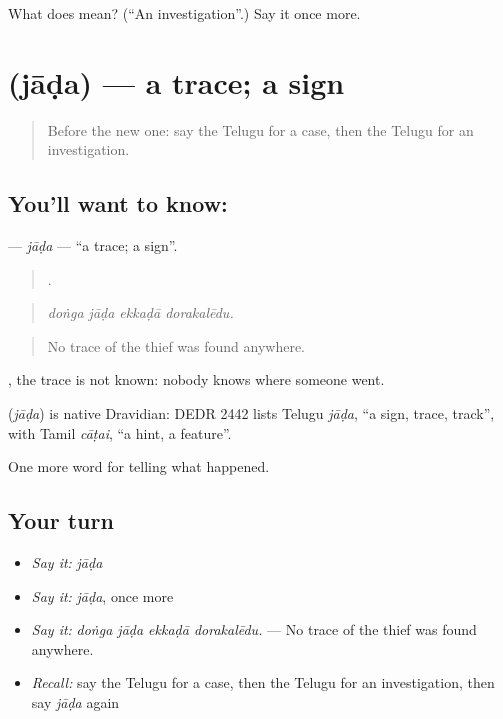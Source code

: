 \begin{tcolorbox}[breakable,colback=teal!4,colframe=teal!35!black,title={Before you move on}]
What does  mean? (\textquotedblleft{}An investigation\textquotedblright{}.) Say it once more.
\end{tcolorbox}
\section[\texorpdfstring{\te{జాడ} (jāḍa)}{జాడ (jāḍa)}]{ (jāḍa) — a trace; a sign}

\label{lesson:TE-C333-jada}



\begin{quote}
Before the new one: say the Telugu for a case, then the Telugu for an investigation.
\end{quote}

\subsection*{You'll want to know: }
\textbf{} — \emph{jāḍa} — \textquotedblleft{}a trace; a sign\textquotedblright{}.

\begin{quote}
   .
\end{quote}

\begin{quote}
\emph{doṅga jāḍa ekkaḍā dorakalēdu.}
\end{quote}

\begin{quote}
No trace of the thief was found anywhere.
\end{quote}

 , the trace is not known: nobody knows where someone went.

\begin{cousinweb}
\textbf{} (\emph{jāḍa}) is native Dravidian: DEDR 2442 lists Telugu \emph{jāḍa}, \textquotedblleft{}a sign, trace, track\textquotedblright{}, with Tamil \emph{cāṭai}, \textquotedblleft{}a hint, a feature\textquotedblright{}.
\end{cousinweb}

\begin{grammarlens}[title={What you've built}]
One more word for telling what happened.
\end{grammarlens}

\subsection*{Your turn}
\begin{itemize}
\raggedright
  \item \emph{Say it:} \emph{jāḍa}
  \item \emph{Say it:} \emph{jāḍa}, once more
  \item \emph{Say it:} \emph{doṅga jāḍa ekkaḍā dorakalēdu.} — No trace of the thief was found anywhere.
  \item \emph{Recall:} say the Telugu for a case, then the Telugu for an investigation, then say \emph{jāḍa} again
\end{itemize}

